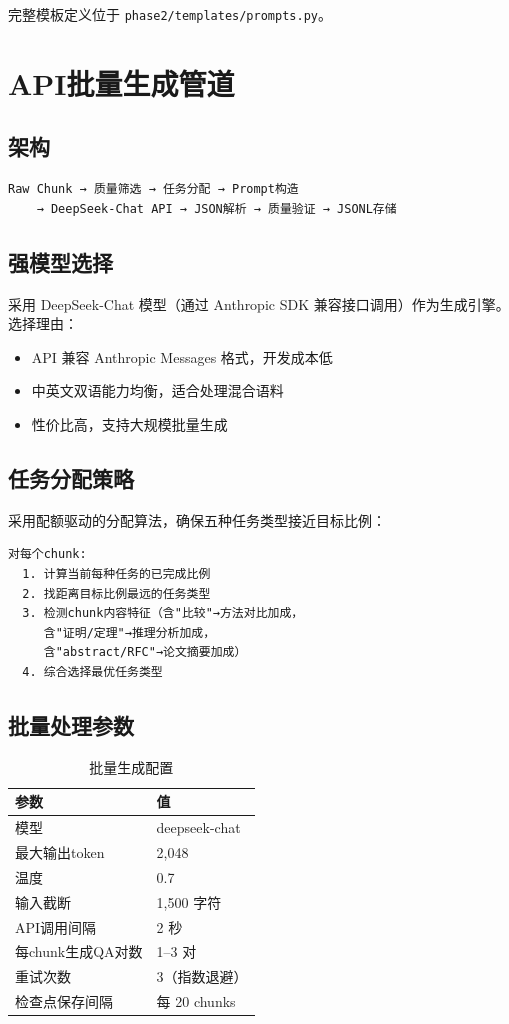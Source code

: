 \documentclass[12pt,a4paper]{ctexart}
\begin{document}
完整模板定义位于 \texttt{phase2/templates/prompts.py}。

\section{API批量生成管道}

\subsection{架构}

\begin{verbatim}
Raw Chunk → 质量筛选 → 任务分配 → Prompt构造
    → DeepSeek-Chat API → JSON解析 → 质量验证 → JSONL存储
\end{verbatim}

\subsection{强模型选择}

采用 DeepSeek-Chat 模型（通过 Anthropic SDK 兼容接口调用）作为生成引擎。选择理由：
\begin{itemize}[nosep]
    \item API 兼容 Anthropic Messages 格式，开发成本低
    \item 中英文双语能力均衡，适合处理混合语料
    \item 性价比高，支持大规模批量生成
\end{itemize}

\subsection{任务分配策略}

采用配额驱动的分配算法，确保五种任务类型接近目标比例：

\begin{verbatim}
对每个chunk:
  1. 计算当前每种任务的已完成比例
  2. 找距离目标比例最远的任务类型
  3. 检测chunk内容特征（含"比较"→方法对比加成，
     含"证明/定理"→推理分析加成，
     含"abstract/RFC"→论文摘要加成）
  4. 综合选择最优任务类型
\end{verbatim}

\subsection{批量处理参数}

\begin{table}[htbp]\centering
\caption{批量生成配置}
\begin{tabular}{@{}ll@{}}
\toprule
\textbf{参数} & \textbf{值} \\
\midrule
模型 & deepseek-chat \\
最大输出token & 2,048 \\
温度 & 0.7 \\
输入截断 & 1,500 字符 \\
API调用间隔 & 2 秒 \\
每chunk生成QA对数 & 1--3 对 \\
重试次数 & 3（指数退避） \\
检查点保存间隔 & 每 20 chunks \\
\bottomrule
\end{tabular}
\end{table}
\end{document}
